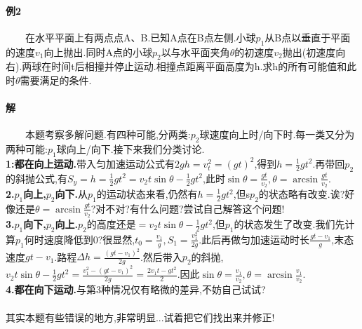  \paragraph{例2} 
 \ \ \ \ 
 在水平平面上有两点点A、B.已知A点在B点左侧.小球$p_1$从B点以垂直于平面的速度$v_1$向上抛出.同时A点的小球$p_2$以与水平面夹角$\theta$的初速度$v_2$抛出(初速度向右).两球在时间t后相撞并停止运动.相撞点距离平面高度为h.求h的所有可能值和此时$\theta$需要满足的条件.
 \paragraph{解}
 \ \ \ \ 本题考察多解问题.有四种可能,分两类:$p_2$球速度向上时/向下时.每一类又分为两种可能:$p_1$球向上/向下.接下来我们分类讨论.\\
 \textbf{1:都在向上运动.}带入匀加速运动公式有$2gh=v^2_t=(gt)^2$,得到$h=\frac{1}{2}gt^2$.再带回$p_2$的斜抛公式,有$S_y=h=\frac{1}{2}gt^2=v_2t\sin\theta-\frac{1}{2}gt^2$,此时$\sin\theta=\frac{gt}{v_2},\theta=\arcsin\frac{gt}{v_2}$.\\
 \textbf{2.$p_1$向上,$p_2$向下.}从$p_1$的运动状态来看,仍然有$h=\frac{1}{2}gt^2$,但s$p_2$的状态略有改变.诶?好像还是$\theta=\arcsin\frac{gt}{v_2}$?对不对?有什么问题?尝试自己解答这个问题!\\
 \textbf{3.$p_1$向下,$p_2$向上.}$p_2$的高度还是$=v_2t\sin\theta-\frac{1}{2}gt^2$,但$p_1$的状态发生了改变.我们先计算$p_1$何时速度降低到0?很显然,$t_0=\frac{v_1}{g},S_1=\frac{v^2_1}{2g}$.此后再做匀加速运动时长$\frac{gt-v_1}{g}$,末态速度$gt-v_1$.路程$\Delta h=\frac{(gt-v_1)^2}{2g}$.然后带入$p_2$的斜抛,$v_2t\sin\theta-\frac{1}{2}gt^2=\frac{v^2_1-(gt-v_1)^2}{2g}=\frac{2v_1t-gt^2}{2}$.因此$\sin\theta=\frac{v_1}{v_2},\theta=\arcsin\frac{v_1}{v_2}$.\\
 \textbf{4.都在向下运动.}与第3种情况仅有略微的差异,不妨自己试试?\\\\
 { 其实本题有些错误的地方,非常明显...试着把它们找出来并修正!}\\
